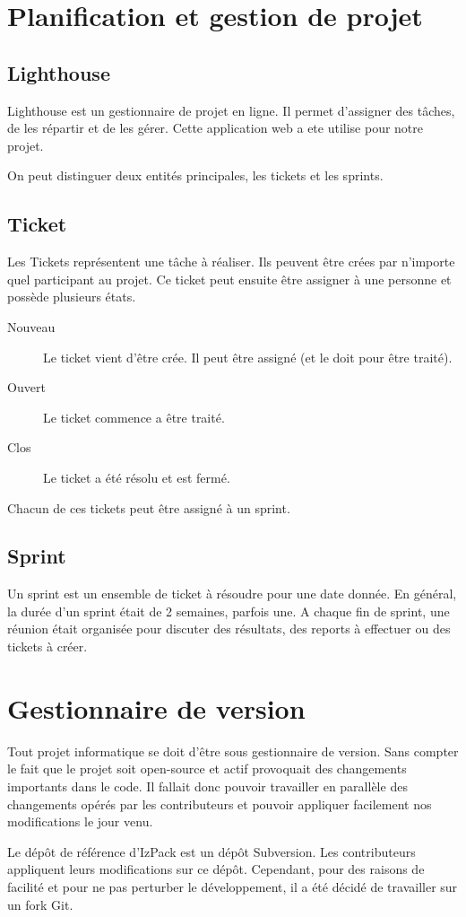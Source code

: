 \section{Planification et gestion de projet}
\subsection{Lighthouse}
Lighthouse est un gestionnaire de projet en ligne. Il permet d'assigner des tâches, de les répartir et de les gérer.
Cette application web a ete utilise pour notre projet.

On peut distinguer deux entités principales, les tickets et les sprints.
\subsection{Ticket}
Les Tickets représentent une tâche à réaliser. Ils peuvent être crées par n'importe quel participant au projet. Ce ticket peut ensuite être assigner à une personne et possède plusieurs états.
\begin{description}
\item[Nouveau] Le ticket vient d'être crée. Il peut être assigné (et le doit pour être traité).
\item[Ouvert] Le ticket commence a être traité.
\item[Clos] Le ticket a été résolu et est fermé.
\end{description}
Chacun de ces tickets peut être assigné à un sprint.
\subsection{Sprint}
Un sprint est un ensemble de ticket à résoudre pour une date donnée. En général, la durée d'un sprint était de 2 semaines, parfois une. A chaque fin de sprint, une réunion était organisée pour discuter des résultats, des reports à effectuer ou des tickets à créer.
\section{Gestionnaire de version}
Tout projet informatique se doit d'être sous gestionnaire de version. Sans compter le fait que le projet soit open-source et actif provoquait des changements importants dans le code. Il fallait donc pouvoir travailler en parallèle des changements opérés par les contributeurs et pouvoir appliquer facilement nos modifications le jour venu.

Le dépôt de référence d'IzPack est un dépôt Subversion. Les contributeurs appliquent leurs modifications sur ce dépôt. Cependant, pour des raisons de facilité et pour ne pas perturber le développement, il a été décidé de travailler sur un fork Git.
